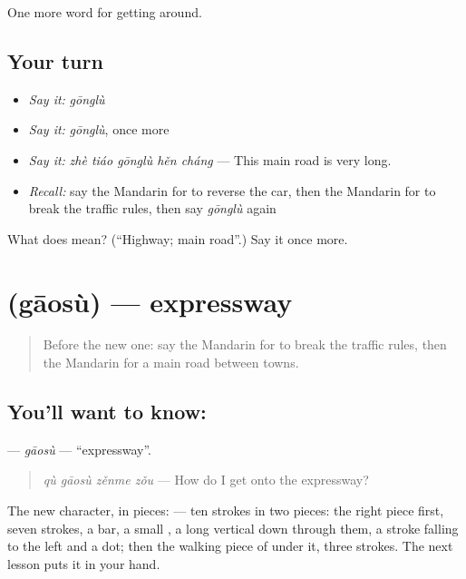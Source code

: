 \begin{grammarlens}[title={What you've built}]
One more word for getting around.
\end{grammarlens}

\subsection*{Your turn}
\begin{itemize}
\raggedright
  \item \emph{Say it:} \emph{gōnglù}
  \item \emph{Say it:} \emph{gōnglù}, once more
  \item \emph{Say it:} \emph{zhè tiáo gōnglù hěn cháng} — This main road is very long.
  \item \emph{Recall:} say the Mandarin for to reverse the car, then the Mandarin for to break the traffic rules, then say \emph{gōnglù} again
\end{itemize}

\begin{tcolorbox}[breakable,colback=teal!4,colframe=teal!35!black,title={Before you move on}]
What does  mean? (\textquotedblleft{}Highway; main road\textquotedblright{}.) Say it once more.
\end{tcolorbox}
\section[\texorpdfstring{\zh{高速} (gāosù)}{高速 (gāosù)}]{ (gāosù) — expressway}

\label{lesson:ZH-C421-gaosu}



\begin{quote}
Before the new one: say the Mandarin for to break the traffic rules, then the Mandarin for a main road between towns.
\end{quote}

\subsection*{You'll want to know: }
\textbf{} — \emph{gāosù} — \textquotedblleft{}expressway\textquotedblright{}.

\begin{quote}
\textbf{} \emph{qù gāosù zěnme zǒu} — How do I get onto the expressway?
\end{quote}

The new character, in pieces:  — ten strokes in two pieces: the right piece first, seven strokes, a bar, a small , a long vertical down through them, a stroke falling to the left and a dot; then the walking piece of  under it, three strokes. The next lesson puts it in your hand.

